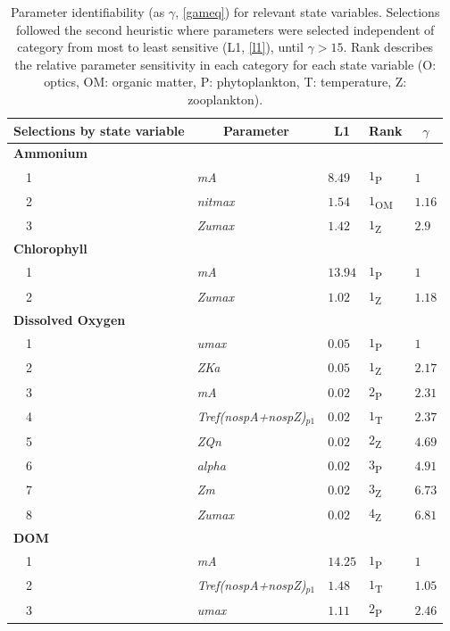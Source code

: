 \documentclass[review]{elsarticle}\usepackage[]{graphicx}\usepackage[]{color}
\begin{document}
\begin{table}[!tbp]
{\scriptsize
\caption{Parameter identifiability (as $\gamma$, \cref{gameq}) for relevant state variables.  Selections followed the second heuristic where parameters were selected independent of category from most to least sensitive (L1, \cref{l1}), until $\gamma > 15$.  Rank describes the relative parameter sensitivity in each category for each state variable (O: optics, OM: organic matter, P: phytoplankton, T: temperature, Z: zooplankton).\label{tab:heurist2}} 
\begin{center}
\begin{tabular}{lllll}
\hline\hline
\multicolumn{1}{l}{Selections by state variable}&\multicolumn{1}{c}{Parameter}&\multicolumn{1}{c}{L1}&\multicolumn{1}{c}{Rank}&\multicolumn{1}{c}{$\gamma$}\tabularnewline
\hline
{\bfseries Ammonium}&&&&\tabularnewline
~~1&\scriptsize{\textit{mA}}&$8.49$&$1$\textsubscript{P}&$1$\tabularnewline
~~2&\scriptsize{\textit{nitmax}}&$1.54$&$1$\textsubscript{OM}&$1.16$\tabularnewline
~~3&\scriptsize{\textit{Zumax}}&$1.42$&$1$\textsubscript{Z}&$2.9$\tabularnewline
\hline
{\bfseries Chlorophyll}&&&&\tabularnewline
~~1&\scriptsize{\textit{mA}}&$13.94$&$1$\textsubscript{P}&$1$\tabularnewline
~~2&\scriptsize{\textit{Zumax}}&$1.02$&$1$\textsubscript{Z}&$1.18$\tabularnewline
\hline
{\bfseries Dissolved Oxygen}&&&&\tabularnewline
~~1&\scriptsize{\textit{umax}}&$0.05$&$1$\textsubscript{P}&$1$\tabularnewline
~~2&\scriptsize{\textit{ZKa}}&$0.05$&$1$\textsubscript{Z}&$2.17$\tabularnewline
~~3&\scriptsize{\textit{mA}}&$0.02$&$2$\textsubscript{P}&$2.31$\tabularnewline
~~4&\scriptsize{\textit{Tref(nospA+nospZ)$_{p1}$}}&$0.02$&$1$\textsubscript{T}&$2.37$\tabularnewline
~~5&\scriptsize{\textit{ZQn}}&$0.02$&$2$\textsubscript{Z}&$4.69$\tabularnewline
~~6&\scriptsize{\textit{alpha}}&$0.02$&$3$\textsubscript{P}&$4.91$\tabularnewline
~~7&\scriptsize{\textit{Zm}}&$0.02$&$3$\textsubscript{Z}&$6.73$\tabularnewline
~~8&\scriptsize{\textit{Zumax}}&$0.02$&$4$\textsubscript{Z}&$6.81$\tabularnewline
\hline
{\bfseries DOM}&&&&\tabularnewline
~~1&\scriptsize{\textit{mA}}&$14.25$&$1$\textsubscript{P}&$1$\tabularnewline
~~2&\scriptsize{\textit{Tref(nospA+nospZ)$_{p1}$}}&$1.48$&$1$\textsubscript{T}&$1.05$\tabularnewline
~~3&\scriptsize{\textit{umax}}&$1.11$&$2$\textsubscript{P}&$2.46$\tabularnewline

\end{tabular}
\end{center}}
\end{table}
\end{document}
